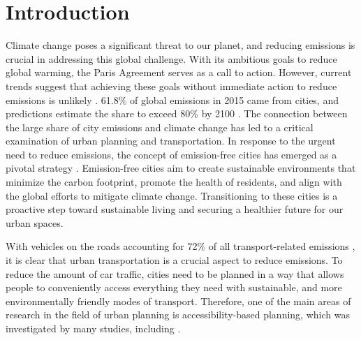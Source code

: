 \clearpage
\section{Introduction}
\label{sec:introduction}


Climate change poses a significant threat to our planet, and reducing emissions is crucial in addressing this global challenge.
With its ambitious goals to reduce global warming, the Paris Agreement serves as a call to action.
However, current trends suggest that achieving these goals without immediate action to reduce emissions is unlikely .
61.8\% of global emissions in 2015 came from cities, and predictions estimate the share to exceed 80\% by 2100 .
The connection between the large share of city emissions and climate change has led to a critical examination of urban planning and transportation.
In response to the urgent need to reduce emissions, the concept of emission-free cities has emerged as a pivotal strategy .
Emission-free cities aim to create sustainable environments that minimize the carbon footprint, promote the health of residents, and align with the global efforts to mitigate climate change.
Transitioning to these cities is a proactive step toward sustainable living and securing a healthier future for our urban spaces.


With vehicles on the roads accounting for 72\% of all transport-related emissions , it is clear that urban transportation is a crucial aspect to reduce emissions.
To reduce the amount of car traffic, cities need to be planned in a way that allows people to conveniently access everything they need with sustainable, and more environmentally friendly modes of transport.
Therefore, one of the main areas of research in the field of urban planning is accessibility-based planning, which was investigated by many studies, including .

